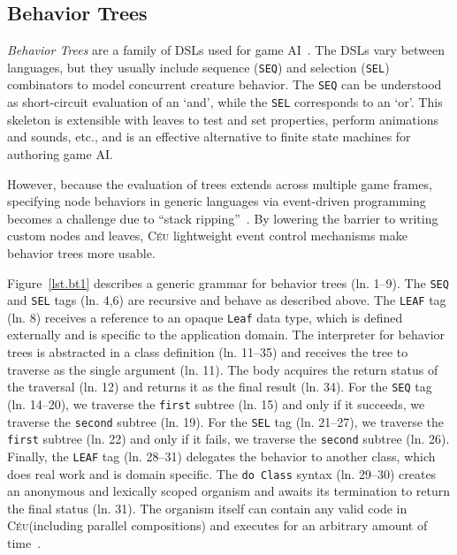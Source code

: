 \documentclass{sig-alternate}
\newcommand{\CEU}{\textsc{C\'{e}u}\xspace}
\newcommand{\code}[1] {{\small{\texttt{#1}}}}
\begin{document}
\subsection{Behavior Trees}
\label{subsec.bt}

\emph{Behavior Trees} are a family of DSLs used for game 
AI~\cite{isla2005,hecker2009my}.
The DSLs vary between languages, but they usually include sequence (\code{SEQ}) 
and selection (\code{SEL}) combinators to model concurrent creature behavior.
%
The \code{SEQ} can be understood as short-circuit evaluation of an `and',
while the \code{SEL} corresponds to an `or'.
%
This skeleton is extensible with leaves to test and set properties, perform 
animations and sounds, etc., and is an effective alternative to finite state 
machines for authoring game AI.

However, because the evaluation of trees extends across multiple game frames, 
specifying node behaviors in generic languages via event-driven programming 
becomes a challenge due to ``stack ripping''~\cite{krohn2007events}.
%
%
By lowering the barrier to writing custom nodes and leaves, \CEU lightweight 
event control mechanisms make behavior trees more usable.

Figure~\ref{lst.bt1} describes a generic grammar for behavior trees (ln. 
1--9).
The \code{SEQ} and \code{SEL} tags (ln. 4,6) are recursive and behave as 
described above.
%
The \code{LEAF} tag (ln. 8) receives a reference to an opaque \code{Leaf} data 
type, which is defined externally and is specific to the application domain.
%
The interpreter for behavior trees is abstracted in a class definition (ln.  
11--35) and receives the tree to traverse as the single argument (ln. 11).
The body acquires the return status of the traversal (ln. 12) and returns it as 
the final result (ln. 34).
%
%
For the \code{SEQ} tag (ln. 14--20), we traverse the \code{first} subtree 
(ln. 15) and only if it succeeds, we traverse the \code{second} subtree (ln.  
19).
%
For the \code{SEL} tag (ln. 21--27), we traverse the \code{first} subtree 
(ln. 22) and only if it fails, we traverse the \code{second} subtree (ln. 
26).
%
Finally, the \code{LEAF} tag (ln. 28--31) delegates the behavior to another 
class, which does real work and is domain specific.
The \code{do Class} syntax (ln. 29--30) creates an anonymous and lexically 
scoped organism and awaits its termination to return the final status (ln.  
31).
The organism itself can contain any valid code in \CEU (including parallel 
compositions) and executes for an arbitrary amount of time~\cite{ceu.mod15}.
\end{document}
